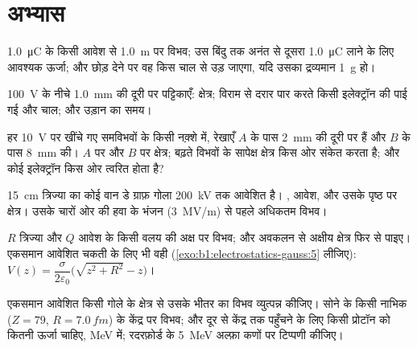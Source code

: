 \section{अभ्यास}

\begin{exercise}[$\star$]\label{exo:b1:potential-capacitors:1}
\qty{1.0}{\micro C} के किसी आवेश से \qty{1.0}{m} पर विभव; उस बिंदु तक अनंत
से दूसरा \qty{1.0}{\micro C} लाने के लिए आवश्यक ऊर्जा; और छोड़ देने पर वह
किस चाल से उड़ जाएगा, यदि उसका द्रव्यमान \qty{1}{g} हो।
\end{exercise}

\begin{exercise}[$\star$]\label{exo:b1:potential-capacitors:2}
\qty{100}{V} के नीचे \qty{1.0}{mm} की दूरी पर पट्टिकाएँ: क्षेत्र; विराम से
दरार पार करते किसी इलेक्ट्रॉन की पाई गई  और चाल; और उड़ान का
समय।
\end{exercise}

\begin{exercise}[$\star$]\label{exo:b1:potential-capacitors:3}
हर \qty{10}{V} पर खींचे गए समविभवों के किसी नक़्शे में, रेखाएँ $A$ के पास
\qty{2}{mm} की दूरी पर हैं और $B$ के पास \qty{8}{mm} की। $A$ पर और $B$ पर
क्षेत्र; बढ़ते विभवों के सापेक्ष क्षेत्र किस ओर संकेत करता है; और कोई
इलेक्ट्रॉन किस ओर त्वरित होता है?
\end{exercise}

\begin{exercise}[$\star$]\label{exo:b1:potential-capacitors:4}
\qty{15}{cm} त्रिज्या का कोई वान डे ग्राफ़ गोला \qty{200}{kV} तक आवेशित है।
, आवेश, और उसके पृष्ठ पर क्षेत्र। उसके चारों ओर की हवा के भंजन
(\qty{3}{MV/m}) से पहले अधिकतम विभव।
\end{exercise}

\begin{exercise}[$\star\star$]\label{exo:b1:potential-capacitors:5}
$R$ त्रिज्या और $Q$ आवेश के किसी वलय की अक्ष पर विभव; और अवकलन से अक्षीय
क्षेत्र फिर से पाइए। एकसमान आवेशित चकती के लिए भी वही
(\cref{exo:b1:electrostatics-gauss:5} लीजिए): $V(z) = \dfrac{\sigma}{2\varepsilon_0}
\bigl(\sqrt{z^2 + R^2} - z\bigr)$।
\end{exercise}

\begin{exercise}[$\star\star$]\label{exo:b1:potential-capacitors:6}
एकसमान आवेशित किसी गोले के क्षेत्र से उसके भीतर का विभव व्युत्पन्न कीजिए।
सोने के किसी नाभिक ($Z = 79$, $R = \qty{7.0}{fm}$) के केंद्र पर विभव;
और दूर से केंद्र तक पहुँचने के लिए किसी प्रोटॉन को कितनी ऊर्जा चाहिए,
\unit{MeV} में; रदरफ़ोर्ड के \qty{5}{MeV} अल्फ़ा कणों पर टिप्पणी कीजिए।
\end{exercise}

